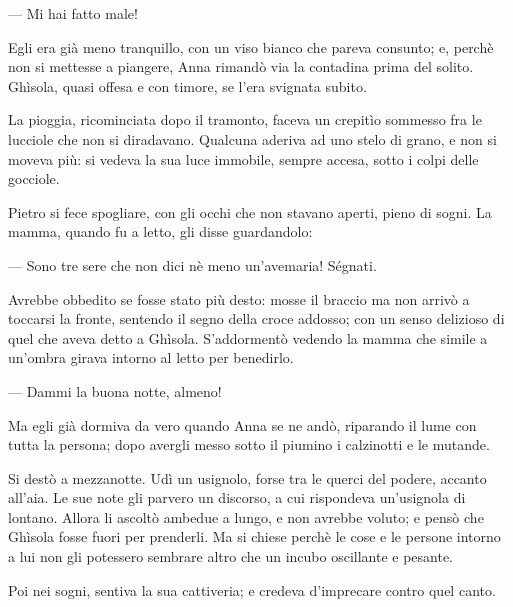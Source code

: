 — Mi hai fatto male!

Egli era già meno tranquillo, con un viso bianco che pareva consunto; e, perchè non si mettesse a piangere, Anna rimandò via la contadina prima del solito. Ghìsola, quasi offesa e con timore, se l’era svignata subito.

La pioggia, ricominciata dopo il tramonto, faceva un crepitìo sommesso fra le lucciole che non si diradavano. Qualcuna aderiva ad uno stelo di grano, e non si moveva più: si vedeva la sua luce immobile, sempre accesa, sotto i colpi delle gocciole.

Pietro si fece spogliare, con gli occhi che non stavano aperti, pieno di sogni. La mamma, quando fu a letto, gli disse guardandolo:

— Sono tre sere che non dici nè meno un'avemaria! Ségnati.

Avrebbe obbedito se fosse stato più desto: mosse il braccio ma non arrivò a toccarsi la fronte, sentendo il segno della croce addosso; con un senso delizioso di quel che aveva detto a Ghìsola. S'addormentò vedendo la mamma che simile a un'ombra girava intorno al letto per benedirlo.

— Dammi la buona notte, almeno!

Ma egli già dormiva da vero quando Anna se ne andò, riparando il lume con tutta la persona; dopo avergli messo sotto il piumino i calzinotti e le mutande.

Si destò a mezzanotte. Udì un usignolo, forse tra le querci del podere, accanto all'aia. Le sue note gli parvero un discorso, a cui rispondeva un'usignola di lontano. Allora li ascoltò ambedue a lungo, e non avrebbe voluto; e pensò che Ghìsola fosse fuori per prenderli. Ma si chiese perchè le cose e le persone intorno a lui non gli potessero sembrare altro che un incubo oscillante e pesante.

Poi nei sogni, sentiva la sua cattiveria; e credeva d'imprecare contro quel canto.

